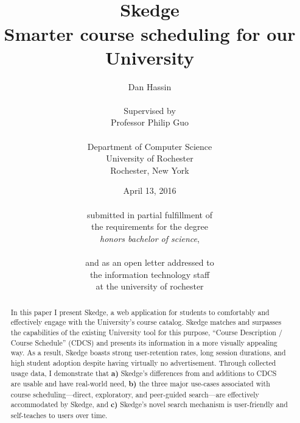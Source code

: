 \documentclass[titlepage]{report}
\title{
\vspace{60pt}\\
\huge \bfseries Skedge \\
\vspace{10pt}
\Large
Smarter course scheduling for our University
}
\author{
	Dan Hassin\\
    \vspace{5pt}\\
    Supervised by\\
    Professor Philip Guo\\
    \vspace{2pt}\\
    Department of Computer Science\\
    University of Rochester\\
    Rochester, New York\\
}
\date{April 13, 2016\\
    \vspace{80pt}\\
    submitted in partial fulfillment of\\
    the requirements for the degree\\
    \emph{honors bachelor of science},\\
    \vspace{40pt}\\
    and as an open letter addressed to\\
    the information technology staff\\
    at the university of rochester
    \vspace{-80pt}
}
\begin{document}
\maketitle


\onehalfspacing

\setcounter{tocdepth}{1}
\tableofcontents

\listoffigures

\clearpage


\doublespacing


\begin{abstract}

\thispagestyle{plain}

In this paper I present Skedge, a web application for students to comfortably and effectively engage with the University's course catalog. Skedge matches and surpasses the capabilities of the existing University tool for this purpose, ``Course Description / Course Schedule'' (CDCS) and presents its information in a more visually appealing way. As a result, Skedge boasts strong user-retention rates, long session durations, and high student adoption despite having virtually no advertisement. Through collected usage data, I demonstrate that \textbf{a)} Skedge's differences from and additions to CDCS are usable and have real-world need, \textbf{b)} the three major use-cases associated with course scheduling---direct, exploratory, and peer-guided search---are effectively accommodated by Skedge, and \textbf{c)} Skedge's novel search mechanism is user-friendly and self-teaches to users over time.

\end{abstract}




\setlength{\skip\footins}{0.75cm}



\clearpage


\clearpage


\clearpage


\clearpage


\clearpage


\singlespacing


\begin{spacing}{0.9}




\end{spacing}


\end{document}
